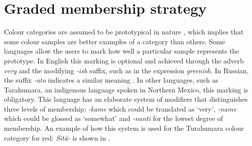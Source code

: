 \chapter{Graded membership strategy}
\label{s:graded-membership-strategy}

Colour categories are assumed to be prototypical in nature
\citep{rosch73natural}, which implies that some colour samples are
better examples of a category than others. Some languages allow the
users to mark how well a particular sample represents the
prototype. In English this marking is optional and achieved through
the adverb \textit{very} and the modifying \textit{-ish} suffix, such as in the
expression \textit{greenish}. In Russian, the suffix \textit{-ato} indicates a
similar meaning \citep{safuanova07russian}. In other languages, such
as Tarahumara, an indigenous language spoken in Northern Mexico, this
marking is obligatory. This language has an elaborate system of
modifiers that distinguishes three levels of membership: \textit{-kame}
which could be translated as `very', \textit{-name} which could be
glossed as `somewhat' and \textit{-nanti} for the lowest degree of
membership. An example of how this system is used for the Turahumara
colour category for red: \textit{Sit\'a-} is shown in  \citep{burgress83tarahumara}.

